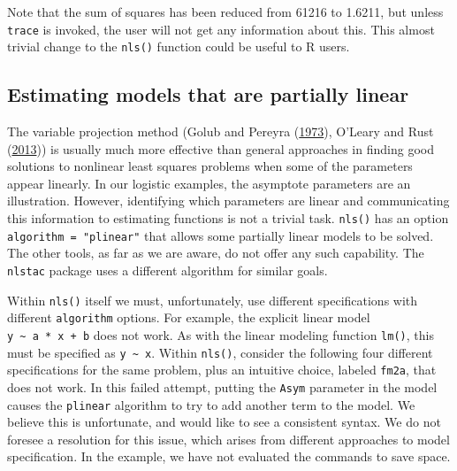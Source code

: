 \documentclass[
]{article}
\begin{document}
Note that the sum of squares has been reduced from 61216 to 1.6211, but
unless \texttt{trace} is invoked, the user will not get any information
about this. This almost trivial change to the \texttt{nls()} function
could be useful to R users.

\hypertarget{estimating-models-that-are-partially-linear}{%
\subsection{Estimating models that are partially
linear}\label{estimating-models-that-are-partially-linear}}

The variable projection method (Golub and Pereyra
(\protect\hyperlink{ref-Golub1973}{1973}), O'Leary and Rust
(\protect\hyperlink{ref-OlearyRust13}{2013})) is usually much more
effective than general approaches in finding good solutions to nonlinear
least squares problems when some of the parameters appear linearly. In
our logistic examples, the asymptote parameters are an illustration.
However, identifying which parameters are linear and communicating this
information to estimating functions is not a trivial task.
\texttt{nls()} has an option \texttt{algorithm\ =\ "plinear"} that
allows some partially linear models to be solved. The other tools, as
far as we are aware, do not offer any such capability. The
\texttt{nlstac} package uses a different algorithm for similar goals.

Within \texttt{nls()} itself we must, unfortunately, use different
specifications with different \texttt{algorithm} options. For example,
the explicit linear model \texttt{y\ \textasciitilde{}\ a\ *\ x\ +\ b}
does not work. As with the linear modeling function \texttt{lm()}, this
must be specified as \texttt{y\ \textasciitilde{}\ x}. Within
\texttt{nls()}, consider the following four different specifications for
the same problem, plus an intuitive choice, labeled \texttt{fm2a}, that
does not work. In this failed attempt, putting the \texttt{Asym}
parameter in the model causes the \texttt{plinear} algorithm to try to
add another term to the model. We believe this is unfortunate, and would
like to see a consistent syntax. We do not foresee a resolution for this
issue, which arises from different approaches to model specification. In
the example, we have not evaluated the commands to save space.
\end{document}
